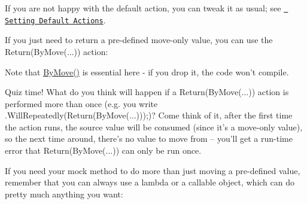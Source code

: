 If you are not happy with the default action, you can tweak it as usual; see \href{\#OnCall}{\texttt{ Setting Default Actions}}.

If you just need to return a pre-\/defined move-\/only value, you can use the {\ttfamily Return(\+By\+Move(...))} action\+:


\begin{DoxyCode}{0}
\DoxyCodeLine{\textcolor{comment}{// When this fires, the unique\_ptr<> specified by ByMove(...) will}}
\DoxyCodeLine{\textcolor{comment}{// be returned.}}
\DoxyCodeLine{}
\end{DoxyCode}


Note that {\ttfamily \mbox{\hyperlink{namespacetesting_acaa432211a3aec62e3d0f24b47bd2dae}{By\+Move()}}} is essential here -\/ if you drop it, the code won’t compile.

Quiz time! What do you think will happen if a {\ttfamily Return(\+By\+Move(...))} action is performed more than once (e.\+g. you write {\ttfamily .Will\+Repeatedly(Return(\+By\+Move(...)));})? Come think of it, after the first time the action runs, the source value will be consumed (since it’s a move-\/only value), so the next time around, there’s no value to move from -- you’ll get a run-\/time error that {\ttfamily Return(\+By\+Move(...))} can only be run once.

If you need your mock method to do more than just moving a pre-\/defined value, remember that you can always use a lambda or a callable object, which can do pretty much anything you want\+:


\begin{DoxyCode}{0}
\DoxyCodeLine{    \});}
\DoxyCodeLine{}
\end{DoxyCode}


